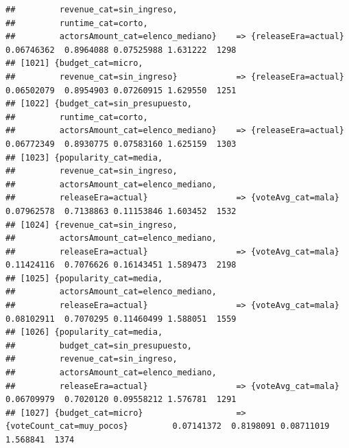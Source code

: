 \documentclass[
]{article}
\begin{document}
\begin{verbatim}
##         revenue_cat=sin_ingreso,                                                                                                
##         runtime_cat=corto,                                                                                                      
##         actorsAmount_cat=elenco_mediano}    => {releaseEra=actual}               0.06746362  0.8964088 0.07525988 1.631222  1298
## [1021] {budget_cat=micro,                                                                                                       
##         revenue_cat=sin_ingreso}            => {releaseEra=actual}               0.06502079  0.8954903 0.07260915 1.629550  1251
## [1022] {budget_cat=sin_presupuesto,                                                                                             
##         runtime_cat=corto,                                                                                                      
##         actorsAmount_cat=elenco_mediano}    => {releaseEra=actual}               0.06772349  0.8930775 0.07583160 1.625159  1303
## [1023] {popularity_cat=media,                                                                                                   
##         revenue_cat=sin_ingreso,                                                                                                
##         actorsAmount_cat=elenco_mediano,                                                                                        
##         releaseEra=actual}                  => {voteAvg_cat=mala}                0.07962578  0.7138863 0.11153846 1.603452  1532
## [1024] {revenue_cat=sin_ingreso,                                                                                                
##         actorsAmount_cat=elenco_mediano,                                                                                        
##         releaseEra=actual}                  => {voteAvg_cat=mala}                0.11424116  0.7076626 0.16143451 1.589473  2198
## [1025] {popularity_cat=media,                                                                                                   
##         actorsAmount_cat=elenco_mediano,                                                                                        
##         releaseEra=actual}                  => {voteAvg_cat=mala}                0.08102911  0.7070295 0.11460499 1.588051  1559
## [1026] {popularity_cat=media,                                                                                                   
##         budget_cat=sin_presupuesto,                                                                                             
##         revenue_cat=sin_ingreso,                                                                                                
##         actorsAmount_cat=elenco_mediano,                                                                                        
##         releaseEra=actual}                  => {voteAvg_cat=mala}                0.06709979  0.7020120 0.09558212 1.576781  1291
## [1027] {budget_cat=micro}                   => {voteCount_cat=muy_pocos}         0.07141372  0.8198091 0.08711019 1.568841  1374
\end{verbatim}
\end{document}
